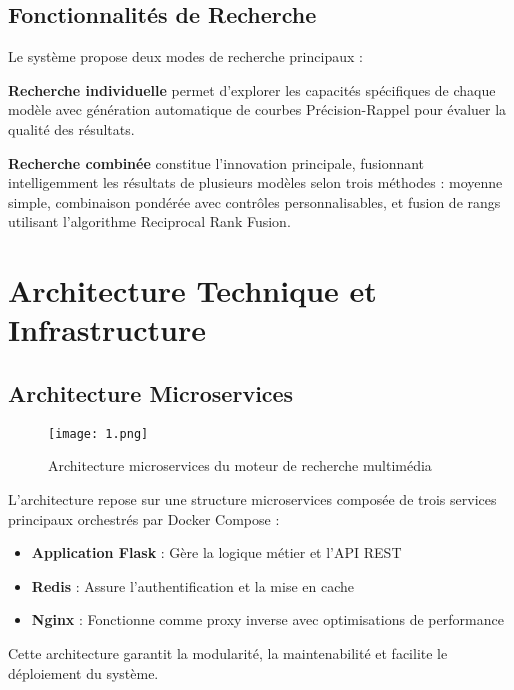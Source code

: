 \documentclass[12pt,a4paper]{article}
\begin{document}
\subsection{Fonctionnalités de Recherche}

\begin{implementedbox}
Le système propose deux modes de recherche principaux :

\textbf{Recherche individuelle} permet d'explorer les capacités spécifiques de chaque modèle avec génération automatique de courbes Précision-Rappel pour évaluer la qualité des résultats.

\textbf{Recherche combinée} constitue l'innovation principale, fusionnant intelligemment les résultats de plusieurs modèles selon trois méthodes : moyenne simple, combinaison pondérée avec contrôles personnalisables, et fusion de rangs utilisant l'algorithme Reciprocal Rank Fusion.
\end{implementedbox}

\section{Architecture Technique et Infrastructure}

\subsection{Architecture Microservices}

\begin{figure}[h]
  \centering
  \texttt{[image: 1.png]}
  \caption{Architecture microservices du moteur de recherche multimédia}
  \label{fig:architecture}
\end{figure}

\begin{implementedbox}
L'architecture repose sur une structure microservices composée de trois services principaux orchestrés par Docker Compose :

\begin{itemize}
    \item \textbf{Application Flask} : Gère la logique métier et l'API REST
    \item \textbf{Redis} : Assure l'authentification et la mise en cache
    \item \textbf{Nginx} : Fonctionne comme proxy inverse avec optimisations de performance
\end{itemize}

Cette architecture garantit la modularité, la maintenabilité et facilite le déploiement du système.
\end{implementedbox}
\end{document}
